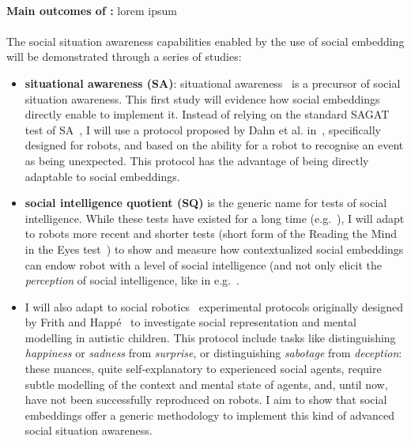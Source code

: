 \begin{rewrite}
\end{rewrite}


\paragraph{\TDA}

\begin{framed}
    {\noindent\bf Main outcomes of \tDA:} lorem ipsum 
\end{framed}

\paragraph{\TDB}

The social situation awareness capabilities enabled by the use of social embedding will be
demonstrated through a series of studies:

\begin{itemize}
    \item {\bf situational awareness (SA)}: situational
        awareness~\cite{endsley1995theory} is a precursor of social situation
        awareness. This first study will evidence how social embeddings directly
        enable to implement it. Instead of relying on the standard SAGAT test of
        SA~\cite{endsley2017direct}, I will use a protocol proposed by Dahn et
        al. in~\cite{dahn2018situation}, specifically designed for robots, and
        based on the ability for a robot to recognise an event as being
        unexpected. This protocol has the advantage of being directly adaptable
        to social embeddings.

    \item {\bf social intelligence quotient (SQ)} is the generic name for tests
        of social intelligence. While these tests have existed for a long time
        (e.g.~\cite{moss1930social}), I will adapt to robots more recent and shorter tests
        (short form of the Reading the Mind in the Eyes
        test~\cite{olderbak2015psychometric}) to show and measure how contextualized social
        embeddings can endow robot with a level of social intelligence (and not
        only elicit the \emph{perception} of social intelligence, like in
        e.g.~\cite{barchard2020measuring}.

    \item I will also adapt to social robotics~\cite{lemaignan2015mutual}
        experimental protocols originally designed by Frith and
        Happé~\cite{frith1994autism} to investigate social representation and
        mental modelling in autistic children.  This protocol include tasks like
        distinguishing \emph{happiness} or \emph{sadness} from \emph{surprise},
        or distinguishing \emph{sabotage} from \emph{deception}: these nuances,
        quite self-explanatory to experienced social agents, require subtle
        modelling of the context and mental state of agents, and, until now,
        have not been successfully reproduced on robots. I aim to show that
        social embeddings offer a generic methodology to implement this kind of
        advanced social situation awareness.

\end{itemize}

